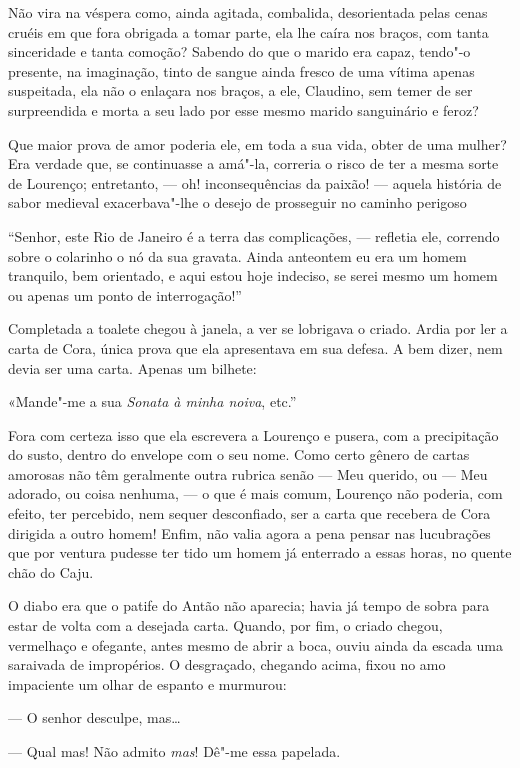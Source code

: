 Não vira na véspera como, ainda agitada, combalida, desorientada pelas
cenas cruéis em que fora obrigada a tomar parte, ela lhe caíra nos
braços, com tanta sinceridade e tanta comoção? Sabendo do que o marido
era capaz, tendo"-o presente, na imaginação, tinto de sangue ainda fresco
de uma vítima apenas suspeitada, ela não o enlaçara nos braços, a ele,
Claudino, sem temer de ser surpreendida e morta a seu lado por esse
mesmo marido sanguinário e feroz?

Que maior prova de amor poderia ele, em toda a sua vida, obter de uma
mulher? Era verdade que, se continuasse a amá"-la, correria o risco de
ter a mesma sorte de Lourenço; entretanto, --- oh! inconsequências da
paixão! --- aquela história de sabor medieval exacerbava"-lhe o desejo de
prosseguir no caminho perigoso

``Senhor, este Rio de Janeiro é a terra das complicações, --- refletia
ele, correndo sobre o colarinho o nó da sua gravata. Ainda anteontem eu
era um homem tranquilo, bem orientado, e aqui estou hoje indeciso, se
serei mesmo um homem ou apenas um ponto de interrogação!''

Completada a toalete chegou à janela, a ver se lobrigava o criado. Ardia
por ler a carta de Cora, única prova que ela apresentava em sua defesa.
A bem dizer, nem devia ser uma carta. Apenas um bilhete:

«Mande"-me a sua \emph{Sonata à minha noiva}, etc.''

Fora com certeza isso que ela escrevera a Lourenço e pusera, com a
precipitação do susto, dentro do envelope com o seu nome. Como certo
gênero de cartas amorosas não têm geralmente outra rubrica senão --- Meu
querido, ou --- Meu adorado, ou coisa nenhuma, --- o que é mais comum,
Lourenço não poderia, com efeito, ter percebido, nem sequer desconfiado,
ser a carta que recebera de Cora dirigida a outro homem! Enfim, não
valia agora a pena pensar nas lucubrações que por ventura pudesse ter
tido um homem já enterrado a essas horas, no quente chão do Caju.

O diabo era que o patife do Antão não aparecia; havia já tempo de sobra
para estar de volta com a desejada carta. Quando, por fim, o criado
chegou, vermelhaço e ofegante, antes mesmo de abrir a boca, ouviu ainda
da escada uma saraivada de impropérios. O desgraçado, chegando acima,
fixou no amo impaciente um olhar de espanto e murmurou:

--- O senhor desculpe, mas\ldots{}

--- Qual mas! Não admito \emph{mas}! Dê"-me essa papelada.

